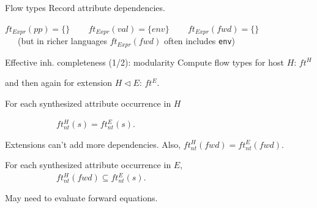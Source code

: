 \documentclass[notes,11pt,aspectratio=169]{beamer}
\begin{document}
\begin{frame}[t]{Flow types}
Record attribute dependencies. \ \ 

\bigskip
$ft_{Expr}(pp) = \{ \}$  \ \ \ 
%
$ft_{Expr}(val) = \{ env \}$ \ \ \ 
%
$ft_{Expr}(fwd) = \{ \}$ \\
\ \ \  {\small (but in richer languages $ft_{Expr}(fwd)$ often includes \texttt{env})}

\bigskip
{}

\end{frame}


\begin{frame}[t]{Effective inh. completeness (1/2): modularity}
\bis{0.8cm}
\x Compute flow types for host $H$: $ft^H$ 

   and then again for extension $H \triangleleft E$: $ft^E$.

\x For each synthesized attribute occurrence in $H$

   ~~~~~~~~~~~~$ft^H_{nt}(s) = ft^E_{nt}(s)$.

 \bi
  \x Extensions can't add more dependencies.
  \x Also, $ft^H_{nt}(fwd) = ft^E_{nt}(fwd)$.
 \ei

\x For each synthesized attribute occurrence in $E$,\\

   ~~~~~~~~~~~~$ft^H_{nt}(fwd) \subseteq ft^E_{nt}(s)$.

 \bi
  \x May need to evaluate forward equations.
 \ei
\ei
\end{frame}
\end{document}
